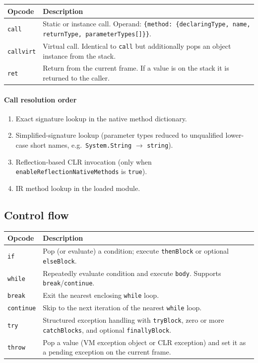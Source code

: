 \documentclass[11pt,a4paper]{article}
\begin{document}
\begin{center}
\begin{tabular}{lp{9cm}}
\toprule
\textbf{Opcode} & \textbf{Description} \\
\midrule
\texttt{call}     & Static or instance call.  Operand: \texttt{\{method: \{declaringType, name, returnType, parameterTypes[]\}\}}. \\
\texttt{callvirt} & Virtual call.  Identical to \texttt{call} but additionally pops an object instance from the stack. \\
\texttt{ret}      & Return from the current frame.  If a value is on the stack it is returned to the caller. \\
\bottomrule
\end{tabular}
\end{center}

\paragraph{Call resolution order}
\begin{enumerate}
  \item Exact signature lookup in the native method dictionary.
  \item Simplified-signature lookup (parameter types reduced to unqualified
        lower-case short names, e.g.\ \texttt{System.String} $\to$ \texttt{string}).
  \item Reflection-based CLR invocation (only when
        \texttt{enableReflectionNativeMethods} is \texttt{true}).
  \item IR method lookup in the loaded module.
\end{enumerate}

\subsection{Control flow}

\begin{center}
\begin{tabular}{lp{9cm}}
\toprule
\textbf{Opcode}    & \textbf{Description} \\
\midrule
\texttt{if}        & Pop (or evaluate) a condition; execute \texttt{thenBlock} or optional \texttt{elseBlock}. \\
\texttt{while}     & Repeatedly evaluate condition and execute \texttt{body}.  Supports \texttt{break}/\texttt{continue}. \\
\texttt{break}     & Exit the nearest enclosing \texttt{while} loop. \\
\texttt{continue}  & Skip to the next iteration of the nearest \texttt{while} loop. \\
\texttt{try}       & Structured exception handling with \texttt{tryBlock}, zero or more \texttt{catchBlocks}, and optional \texttt{finallyBlock}. \\
\texttt{throw}     & Pop a value (VM exception object or CLR exception) and set it as a pending exception on the current frame. \\
\bottomrule
\end{tabular}
\end{center}
\end{document}
